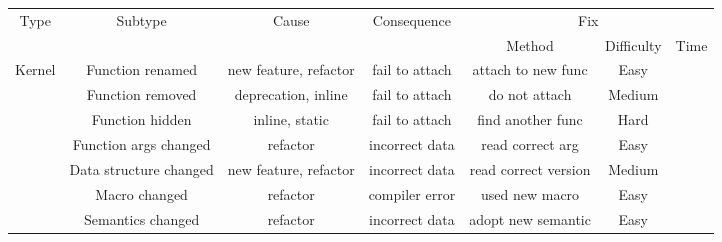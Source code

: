 \begin{table*}
  \centering
  \begin{tabular}{c|c|c|c|c|c|c}
    \multirow{2}{*}{Type}        &
    \multirow{2}{*}{Subtype}     &
    \multirow{2}{*}{Cause}       &
    \multirow{2}{*}{Consequence} &
    \multicolumn{3}{c}{Fix}                                                                                                                              \\ \cline{5-7}

                                 &                         &                        &                & Method                        & Difficulty & Time \\

    \hline\hline

    \multirow{7}{*}{Kernel}
                                 & Function renamed        & new feature, refactor  & fail to attach & attach to new func            & Easy       &      \\ \cline{2-7}
                                 & Function removed        & deprecation, inline    & fail to attach & do not attach                 & Medium     &      \\ \cline{2-7}
                                 & Function hidden         & inline, static         & fail to attach & find another func             & Hard       &      \\ \cline{2-7}
                                 & Function args changed   & refactor               & incorrect data & read correct arg              & Easy       &      \\ \cline{2-7}
                                 & Data structure changed  & new feature, refactor  & incorrect data & read correct version          & Medium     &      \\ \cline{2-7}
                                 & Macro changed           & refactor               & compiler error & used new macro                & Easy       &      \\ \cline{2-7}
                                 & Semantics changed       & refactor               & incorrect data & adopt new semantic            & Easy       &      \\


\end{tabular}
\end{table*}

